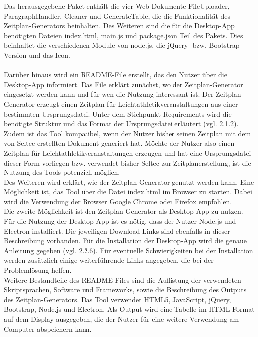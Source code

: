 Das herausgegebene Paket enthält die vier Web-Dokumente FileUploader, ParagraphHandler, Cleaner und GenerateTable, die die Funktionalität des Zeitplan-Generators beinhalten. Des Weiteren sind die für die Desktop-App benötigten Dateien index.html, main.js und package.json Teil des Pakets. Dies beinhaltet die verschiedenen Module von node.js, die jQuery- bzw. Bootstrap-Version und das Icon. \\
\\
Darüber hinaus wird ein README-File erstellt, das den Nutzer über die Desktop-App informiert. Das File erklärt zunächst, wo der Zeitplan-Generator eingesetzt werden kann und für wen die Nutzung interessant ist. Der Zeitplan-Generator erzeugt einen Zeitplan für Leichtathletikveranstaltungen aus einer bestimmten Ursprungsdatei. Unter dem Stichpunkt Requirements wird die benötigte Struktur und das Format der Ursprungsdatei erläutert (vgl. 2.1.2). Zudem ist das Tool kompatibel, wenn der Nutzer bisher seinen Zeitplan mit dem von Seltec erstellten Dokument generiert hat. Möchte der Nutzer also einen Zeitplan für Leichtathletikveranstaltungen erzeugen und hat eine Ursprungsdatei dieser Form vorliegen bzw. verwendet bisher Seltec zur Zeitplanerstellung, ist die Nutzung des Tools potenziell möglich.\\
Des Weiteren wird erklärt, wie der Zeitplan-Generator genutzt werden kann. Eine Möglichkeit ist, das Tool über die Datei index.html im Browser zu starten. Dabei wird die Verwendung der Browser Google Chrome oder Firefox empfohlen. \\
Die zweite Möglichkeit ist den Zeitplan-Generator als Desktop-App zu nutzen. Für die Nutzung der Desktop-App ist es nötig, dass der Nutzer Node.js und Electron installiert. Die jeweiligen Download-Links sind ebenfalls in dieser Beschreibung vorhanden. Für die Installation der Desktop-App wird die genaue Anleitung gegeben (vgl. 2.2.6). Für eventuelle Schwierigkeiten bei der Installation werden zusätzlich einige weiterführende Links angegeben, die bei der Problemlösung helfen.\\
Weitere Bestandteile des README-Files sind die Auflistung der verwendeten Skriptsprachen, Software und Frameworks, sowie die Beschreibung des Outputs des Zeitplan-Generators. Das Tool verwendet HTML5, JavaScript, jQuery, Bootstrap, Node.js und Electron. Als Output wird eine Tabelle im HTML-Format auf dem Display ausgegeben, die der Nutzer für eine weitere Verwendung am Computer abspeichern kann.

